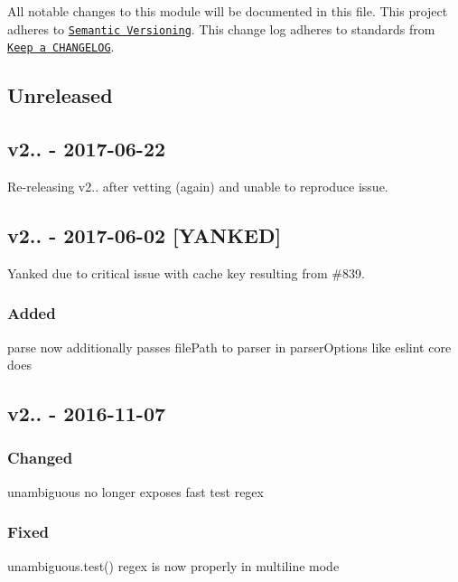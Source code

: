 All notable changes to this module will be documented in this file. This project adheres to \href{http://semver.org/}{\tt Semantic Versioning}. This change log adheres to standards from \href{http://keepachangelog.com}{\tt Keep a C\+H\+A\+N\+G\+E\+L\+OG}.

\subsection*{Unreleased}

\subsection*{v2.. -\/ 2017-\/06-\/22}

Re-\/releasing v2.. after vetting (again) and unable to reproduce issue.

\subsection*{v2.. -\/ 2017-\/06-\/02 \mbox{[}Y\+A\+N\+K\+ED\mbox{]}}

Yanked due to critical issue with cache key resulting from \#839.

\subsubsection*{Added}


\begin{DoxyItemize}
\item {\ttfamily parse} now additionally passes {\ttfamily file\+Path} to {\ttfamily parser} in {\ttfamily parser\+Options} like {\ttfamily eslint} core does
\end{DoxyItemize}

\subsection*{v2.. -\/ 2016-\/11-\/07}

\subsubsection*{Changed}


\begin{DoxyItemize}
\item {\ttfamily unambiguous} no longer exposes fast test regex
\end{DoxyItemize}

\subsubsection*{Fixed}


\begin{DoxyItemize}
\item {\ttfamily unambiguous.\+test()} regex is now properly in multiline mode 
\end{DoxyItemize}